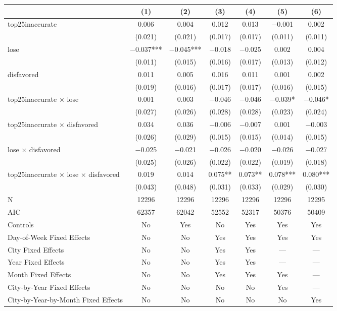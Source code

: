 \begin{table}
\centering
\begin{tabular}[t]{lcccccc}
\toprule
  & (1) & (2) & (3) & (4) & (5) & (6)\\
\midrule
top25inaccurate & \num{0.006} & \num{0.004} & \num{0.012} & \num{0.013} & \num{-0.001} & \num{0.002}\\
 & (\num{0.021}) & (\num{0.021}) & (\num{0.017}) & (\num{0.017}) & (\num{0.011}) & (\num{0.011})\\
lose & \num{-0.037}*** & \num{-0.045}*** & \num{-0.018} & \num{-0.025} & \num{0.002} & \num{0.004}\\
 & (\num{0.011}) & (\num{0.015}) & (\num{0.016}) & (\num{0.017}) & (\num{0.013}) & (\num{0.012})\\
disfavored & \num{0.011} & \num{0.005} & \num{0.016} & \num{0.011} & \num{0.001} & \num{0.002}\\
 & (\num{0.019}) & (\num{0.016}) & (\num{0.017}) & (\num{0.017}) & (\num{0.016}) & (\num{0.015})\\
top25inaccurate × lose & \num{0.001} & \num{0.003} & \num{-0.046} & \num{-0.046} & \num{-0.039}* & \num{-0.046}*\\
 & (\num{0.027}) & (\num{0.026}) & (\num{0.028}) & (\num{0.028}) & (\num{0.023}) & (\num{0.024})\\
top25inaccurate × disfavored & \num{0.034} & \num{0.036} & \num{-0.006} & \num{-0.007} & \num{0.001} & \num{-0.003}\\
 & (\num{0.026}) & (\num{0.029}) & (\num{0.015}) & (\num{0.015}) & (\num{0.014}) & (\num{0.015})\\
lose × disfavored & \num{-0.025} & \num{-0.021} & \num{-0.026} & \num{-0.020} & \num{-0.026} & \num{-0.027}\\
 & (\num{0.025}) & (\num{0.026}) & (\num{0.022}) & (\num{0.022}) & (\num{0.019}) & (\num{0.018})\\
top25inaccurate × lose × disfavored & \num{0.019} & \num{0.014} & \num{0.075}** & \num{0.073}** & \num{0.078}*** & \num{0.080}***\\
 & (\num{0.043}) & (\num{0.048}) & (\num{0.031}) & (\num{0.033}) & (\num{0.029}) & (\num{0.030})\\
\midrule
N & \num{12296} & \num{12296} & \num{12296} & \num{12296} & \num{12296} & \num{12295}\\
AIC & \num{62357} & \num{62042} & \num{52552} & \num{52317} & \num{50376} & \num{50409}\\
Controls & No & Yes & No & Yes & Yes & Yes\\
Day-of-Week Fixed Effects & No & No & Yes & Yes & Yes & Yes\\
City Fixed Effects & No & No & Yes & Yes & — & —\\
Year Fixed Effects & No & No & Yes & Yes & — & —\\
Month Fixed Effects & No & No & Yes & Yes & Yes & —\\
City-by-Year Fixed Effects & No & No & No & No & Yes & —\\
City-by-Year-by-Month Fixed Effects & No & No & No & No & No & Yes\\
\bottomrule
\end{tabular}
\end{table}
